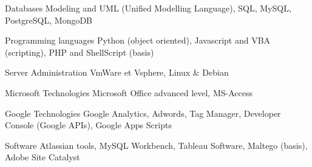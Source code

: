 

\begin{cvskills}

  \cvskill
    {Databases} %
    {Modeling and UML (Unified Modelling Language), SQL, MySQL, PostgreSQL, MongoDB} %
    
  \cvskill
	{Programming languages} %
	{Python (object oriented), Javascript and VBA (scripting), PHP and ShellScript (basis)} %

  \cvskill
	{Server Administration} %
	{VmWare et Vsphere, Linux \& Debian} %
	
  \cvskill
	{Microsoft Technologies} %
	{Microsoft Office advanced level, MS-Access} %

  \cvskill
	{Google Technologies} %
	{Google Analytics, Adwords, Tag Manager, Developer Console (Google APIs), Google Apps Scripts} %


  \cvskill
    {Software} %
    {Atlassian tools, MySQL Workbench, Tableau Software, Maltego (basis), Adobe Site Catalyst} %


\end{cvskills}
